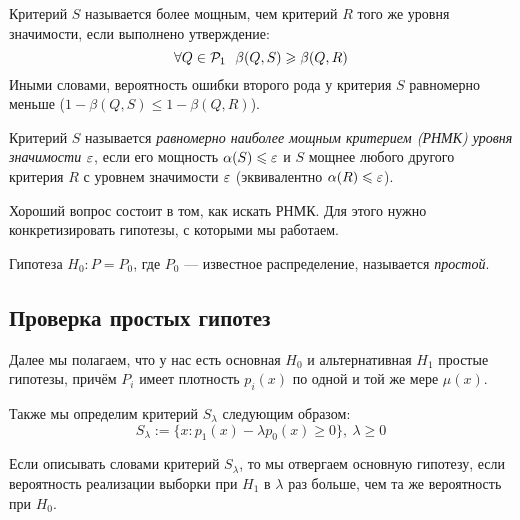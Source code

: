 \begin{definition}
	Критерий $S$ называется более мощным, чем критерий $R$ того же уровня значимости, если выполнено утверждение:
	\[
		\forall Q \in \mathcal{P}_1\ \ \beta(Q, S) \geqslant \beta(Q, R)
	\]
	Иными словами, вероятность ошибки второго рода у критерия $S$ равномерно меньше ($1 - \beta(Q, S) \le 1 - \beta(Q, R)$).
\end{definition}

\begin{definition}
	Критерий $S$ называется \textit{равномерно наиболее мощным критерием (РНМК) уровня значимости $\varepsilon$}, если его мощность $\alpha(S) \leqslant \varepsilon$ и $S$ мощнее любого другого критерия $R$ с уровнем значимости $\varepsilon$ (эквивалентно $\alpha(R) \leqslant \varepsilon$).
\end{definition}

\begin{note}
	Хороший вопрос состоит в том, как искать РНМК. Для этого нужно конкретизировать гипотезы, с которыми мы работаем.
\end{note}

\begin{definition}
	Гипотеза $H_0 \colon P = P_0$, где $P_0$ --- известное распределение, называется \textit{простой}.
\end{definition}

\subsection{Проверка простых гипотез}

\begin{note}
	Далее мы полагаем, что у нас есть основная $H_0$ и альтернативная $H_1$ простые гипотезы, причём $P_i$ имеет плотность $p_i(x)$ по одной и той же мере $\mu(x)$.
	
	Также мы определим критерий $S_\lambda$ следующим образом:
	\[
		S_\lambda := \{x \colon p_1(x) - \lambda p_0(x) \ge 0\},\ \lambda \ge 0
	\]
\end{note}

\begin{anote}
	Если описывать словами критерий $S_\lambda$, то мы отвергаем основную гипотезу, если вероятность реализации выборки при $H_1$ в $\lambda$ раз больше, чем та же вероятность при $H_0$.
\end{anote}

